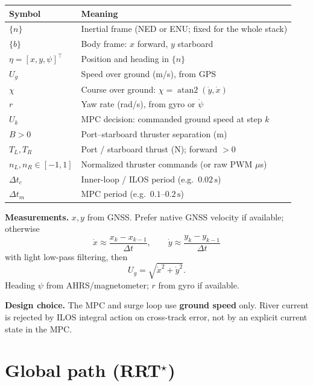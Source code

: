 \documentclass[11pt,a4paper]{article}
\begin{document}
\begin{table}[h]
\centering
\small
\begin{tabular}{@{}ll@{}}
\toprule
Symbol & Meaning \\
\midrule
$\{n\}$ & Inertial frame (NED or ENU; fixed for the whole stack) \\
$\{b\}$ & Body frame: \(x\) forward, \(y\) starboard \\
$\eta=[x,y,\psi]^\top$ & Position and heading in \(\{n\}\) \\
$U_g$ & Speed over ground (m/s), from GPS \\
$\chi$ & Course over ground: \(\chi=\operatorname{atan2}(\dot y,\dot x)\) \\
$r$ & Yaw rate (rad/s), from gyro or \(\dot\psi\) \\
$U_k$ & MPC decision: commanded ground speed at step \(k\) \\
$B>0$ & Port--starboard thruster separation (m) \\
$T_L,T_R$ & Port / starboard thrust (N); forward \(>0\) \\
$n_L,n_R\in[-1,1]$ & Normalized thruster commands (or raw PWM \(\mu\)s) \\
$\Delta t_c$ & Inner-loop / ILOS period (e.g.\ \(0.02\,\mathrm{s}\)) \\
$\Delta t_m$ & MPC period (e.g.\ \(0.1\)--\(0.2\,\mathrm{s}\)) \\
\bottomrule
\end{tabular}
\end{table}

\textbf{Measurements.}
\(x,y\) from GNSS.
Prefer native GNSS velocity if available; otherwise
\[
\dot x \approx \frac{x_k-x_{k-1}}{\Delta t},\qquad
\dot y \approx \frac{y_k-y_{k-1}}{\Delta t}
\]
with light low-pass filtering, then
\[
U_g=\sqrt{\dot x^2+\dot y^2}.
\]
Heading \(\psi\) from AHRS/magnetometer; \(r\) from gyro if available.

\textbf{Design choice.}
The MPC and surge loop use \textbf{ground speed} only.
River current is rejected by ILOS integral action on cross-track error,
not by an explicit current state in the MPC.

\section{Global path (RRT$^\star$)}
\end{document}
